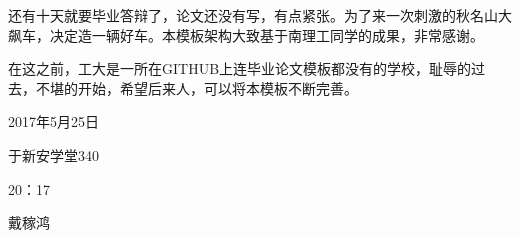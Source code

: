 \begin{thanks}

还有十天就要毕业答辩了，论文还没有写，有点紧张。为了来一次刺激的秋名山大飙车，决定造一辆好车。本模板架构大致基于南理工同学的成果，非常感谢。

在这之前，工大是一所在GITHUB上连毕业论文模板都没有的学校，耻辱的过去，不堪的开始，希望后来人，可以将本模板不断完善。

2017年5月25日

于新安学堂340

20：17

\vskip 18pt

戴稼鸿

\end{thanks}
